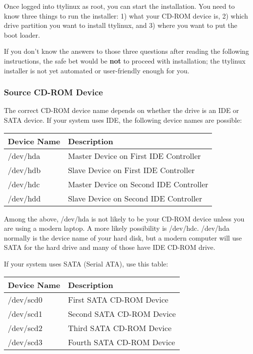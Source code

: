 \documentclass[10pt]{article}
\begin{document}
Once logged into ttylinux as root, you can start the installation. You need to
know three things to run the installer: 1) what your CD-ROM device is, 2) which
drive partition you want to install ttylinux, and 3) where you want to put the
boot loader.

If you don't know the answers to those three questions after reading the
following instructions, the safe bet would be {\bf not} to proceed with
installation; the ttylinux installer is not yet automated or user-friendly
enough for you.

\subsubsection{Source CD-ROM Device}
\label{cdromdev}

The correct CD-ROM device name depends on whether the drive is an IDE or SATA
device. If your system uses IDE, the following device names are possible:

\begin{center}
\begin{tabular}{l|l}
Device Name & Description \\
\hline
/dev/hda & Master Device on First IDE Controller  \\
/dev/hdb & Slave Device on First IDE Controller   \\
/dev/hdc & Master Device on Second IDE Controller \\
/dev/hdd & Slave Device on Second IDE Controller  \\
\end{tabular}
\end{center}

Among the above, /dev/hda is not likely to be your CD-ROM device unless you are
using a modern laptop. A more likely possibility is /dev/hdc. /dev/hda normally
is the device name of your hard disk, but a modern computer will use SATA for
the hard drive and many of those have IDE CD-ROM drive.

If your system uses SATA (Serial ATA), use this table:

\begin{center}
\begin{tabular}{l|l}
Device Name & Description \\
\hline
/dev/scd0 & First SATA CD-ROM Device  \\
/dev/scd1 & Second SATA CD-ROM Device \\
/dev/scd2 & Third SATA CD-ROM Device  \\
/dev/scd3 & Fourth SATA CD-ROM Device \\
\end{tabular}
\end{center}
\end{document}
